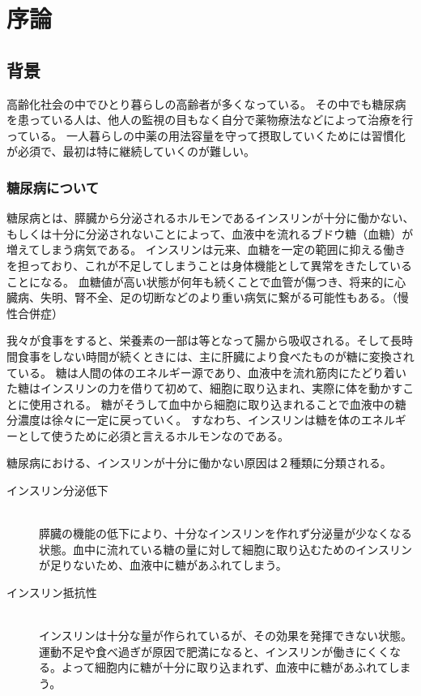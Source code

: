 \chapter{序論}
\label{chap:introduction}

\section{背景}
\label{section:background}
高齢化社会の中でひとり暮らしの高齢者が多くなっている。
その中でも糖尿病を患っている人は、他人の監視の目もなく自分で薬物療法などによって治療を行っている。
一人暮らしの中薬の用法容量を守って摂取していくためには習慣化が必須で、最初は特に継続していくのが難しい。

\subsection{糖尿病について}
\label{subsection:diabetes}

糖尿病とは、膵臓から分泌されるホルモンであるインスリンが十分に働かない、もしくは十分に分泌されないことによって、血液中を流れるブドウ糖（血糖）が増えてしまう病気である。\cite{diabetes}
インスリンは元来、血糖を一定の範囲に抑える働きを担っており、これが不足してしまうことは身体機能として異常をきたしていることになる。
血糖値が高い状態が何年も続くことで血管が傷つき、将来的に心臓病、失明、腎不全、足の切断などのより重い病気に繋がる可能性もある。（慢性合併症）

我々が食事をすると、栄養素の一部は等となって腸から吸収される。そして長時間食事をしない時間が続くときには、主に肝臓により食べたものが糖に変換されている。
糖は人間の体のエネルギー源であり、血液中を流れ筋肉にたどり着いた糖はインスリンの力を借りて初めて、細胞に取り込まれ、実際に体を動かすことに使用される。
糖がそうして血中から細胞に取り込まれることで血液中の糖分濃度は徐々に一定に戻っていく。
すなわち、インスリンは糖を体のエネルギーとして使うために必須と言えるホルモンなのである。\cite{diabetes}

糖尿病における、インスリンが十分に働かない原因は２種類に分類される。\cite{diabetes}

\begin{description}
  \item [インスリン分泌低下]\mbox{}\\
    膵臓の機能の低下により、十分なインスリンを作れず分泌量が少なくなる状態。血中に流れている糖の量に対して細胞に取り込むためのインスリンが足りないため、血液中に糖があふれてしまう。
  \item [インスリン抵抗性]\mbox{}\\
    インスリンは十分な量が作られているが、その効果を発揮できない状態。運動不足や食べ過ぎが原因で肥満になると、インスリンが働きにくくなる。よって細胞内に糖が十分に取り込まれず、血液中に糖があふれてしまう。
\end{description}


